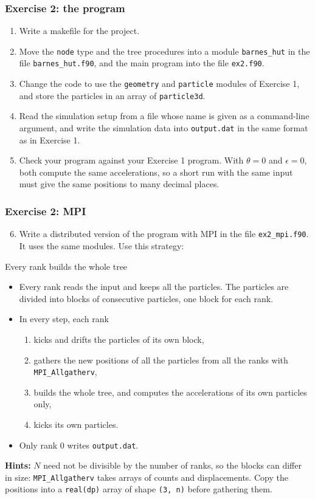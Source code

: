 \begin{frame}
  \frametitle{Exercise 2: the program}
  \begin{enumerate}
    \item Write a makefile for the project.
    \item Move the \texttt{node} type and the tree procedures into a module \texttt{barnes\_hut} in the file \texttt{barnes\_hut.f90}, and the main program into the file \texttt{ex2.f90}.
    \item Change the code to use the \texttt{geometry} and \texttt{particle} modules of Exercise 1, and store the particles in an array of \texttt{particle3d}.
    \item Read the simulation setup from a file whose name is given as a command-line argument, and write the simulation data into \texttt{output.dat} in the same format as in Exercise 1.
    \item Check your program against your Exercise 1 program. With $\theta = 0$ and $\epsilon = 0$, both compute the same accelerations, so a short run with the same input must give the same positions to many decimal places.
  \end{enumerate}
\end{frame}


\begin{frame}
  \frametitle{Exercise 2: MPI}
  \begin{enumerate}
    \setcounter{enumi}{5}
    \item Write a distributed version of the program with MPI in the file \texttt{ex2\_mpi.f90}. It uses the same modules. Use this strategy:
  \end{enumerate}
  \begin{block}{Every rank builds the whole tree}
    \begin{itemize}
      \item Every rank reads the input and keeps all the particles. The particles are divided into blocks of consecutive particles, one block for each rank.
      \item In every step, each rank
        \begin{enumerate}
          \item kicks and drifts the particles of its own block,
          \item gathers the new positions of all the particles from all the ranks with \texttt{MPI\_Allgatherv},
          \item builds the whole tree, and computes the accelerations of its own particles only,
          \item kicks its own particles.
        \end{enumerate}
      \item Only rank 0 writes \texttt{output.dat}.
    \end{itemize}
  \end{block}
  \textbf{Hints:} $N$ need not be divisible by the number of ranks, so the blocks can differ in size: \texttt{MPI\_Allgatherv} takes arrays of counts and displacements. Copy the positions into a \texttt{real(dp)} array of shape \texttt{(3, n)} before gathering them.
\end{frame}


